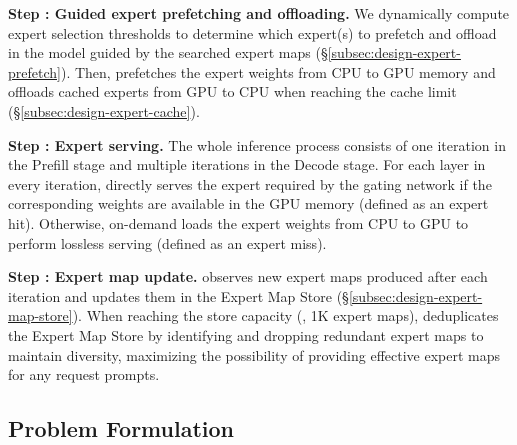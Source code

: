\noindent \textbf{Step {\Large {}}: Guided expert prefetching and offloading.} 
We dynamically compute expert selection thresholds to determine which expert(s) to prefetch and offload in the \MoE model guided by the searched expert maps (\S\ref{subsec:design-expert-prefetch}). Then, \sys prefetches the expert weights from CPU to GPU memory and offloads cached experts from GPU to CPU when reaching the cache limit (\S\ref{subsec:design-expert-cache}).

\noindent \textbf{Step {\Large {}}: Expert serving.} 
The whole inference process consists of one iteration in the Prefill stage and multiple iterations in the Decode stage. For each \MoE layer in every iteration, \sys directly serves the expert required by the gating network if the corresponding weights are available in the GPU memory (defined as an expert hit). Otherwise, \sys on-demand loads the expert weights from CPU to GPU to perform lossless serving (defined as an expert miss).


\noindent \textbf{Step {\Large {}}: Expert map update.} 
\sys observes new expert maps produced after each iteration and updates them in the Expert Map Store (\S\ref{subsec:design-expert-map-store}). When reaching the store capacity (\eg, 1K expert maps), \sys deduplicates the Expert Map Store by identifying and dropping redundant expert maps to maintain diversity, maximizing the possibility of providing effective expert maps for any request prompts.



\subsection{Problem Formulation}

